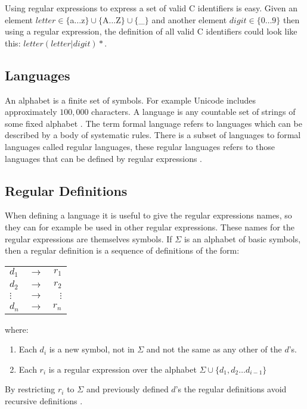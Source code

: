 \begin{example}\label{regexpEx}
Using regular expressions to express a set of valid C identifiers is easy.
Given an element $letter \in \{$a$ \dots $z$\} \cup \{$A$ \dots $Z$\} \cup 
\{$\_$\}$ and another element $digit \in \{0 \dots 9\}$ then using a regular
expression, the definition of all valid C identifiers 
could look like this: $letter (letter | digit)*$. 
\end{example}

\subsection{Languages}
An alphabet is a finite set of symbols. For example Unicode includes
approximately $100,000$ characters. A language is any countable set of strings
of some fixed alphabet \cite{Aho2006}. The term formal language refers to
languages which can be described by a body of systematic rules. There is a
subset of languages to formal languages called regular languages, these regular
languages refers to those languages that can be defined by regular expressions
\cite{Ranta2012}.

\subsection{Regular Definitions}
When defining a language it is useful to give the regular expressions names,
so they can for example be used in other regular expressions. These names for
the regular expressions are themselves symbols. If $\Sigma$ is an alphabet of
basic symbols, then a regular definition is a sequence of definitions of the
form:
\begin{center}
\begin{tabular}{l c r}
$d_1$ & $\to$ & $r_1$\\
$d_2$ & $\to$ & $r_2$\\
$\vdots$ & $\to$ & $\vdots$\\
$d_n$ & $\to$ & $r_n$\\

\end{tabular}
\end{center}
where:
\begin{enumerate}
\item Each $d_i$ is a new symbol, not in $\Sigma$ and not the same as any other
of the $d$'s.
\item Each $r_i$ is a regular expression over the alphabet $\Sigma  \cup \{d_1,
d_2 \dots d_{i-1}\}$
\end{enumerate}
By restricting $r_i$ to $\Sigma$ and previously defined $d$'s the regular
definitions avoid recursive definitions \cite{Aho2006}.

